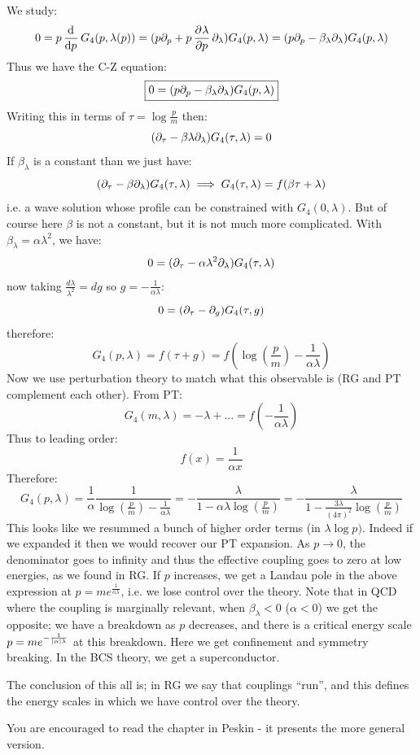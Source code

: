 We study:
\begin{equation}
    0 = p\dod{}{p}G_4(p, \lambda(p)) = (p\p_p + p\dpd{\lambda}{p}\p_\lambda) G_4(p, \lambda) = (p\p_p - \beta_\lambda \p_\lambda) G_4(p, \lambda) 
\end{equation}
Thus we have the C-Z equation:
\begin{equation}
    \boxed{0 = (p\partial_p - \beta_\lambda \partial_\lambda) G_4(p, \lambda)}
\end{equation}
Writing this in terms of $\tau = \log \frac{p}{m}$ then:
\begin{equation}
    (\partial_\tau - \beta\lambda \partial_\lambda)G_4(\tau, \lambda) = 0
\end{equation}
If $\beta_\lambda$ is a constant than we just have:
\begin{equation}
    (\partial_\tau - \beta \partial_\lambda)G_4(\tau, \lambda) \implies G_4(\tau, \lambda) = f(\beta\tau + \lambda)
\end{equation}
i.e. a wave solution whose profile can be constrained with $G_4(0, \lambda)$. But of course here $\beta$ is not a constant, but it is not much more complicated. With $\beta_\lambda = \alpha\lambda^2$, we have:
\begin{equation}
    0 = (\partial_\tau - \alpha\lambda^2\partial_\lambda)G_4(\tau, \lambda)
\end{equation}
now taking $\frac{d\lambda}{\lambda^2} = dg$ so $g = -\frac{1}{\alpha\lambda}$:
\begin{equation}
    0 = (\partial_\tau - \partial_g)G_4(\tau, g)
\end{equation}
therefore:
\begin{equation}
    G_4(p, \lambda) = f(\tau + g) = f(\log(\frac{p}{m}) - \frac{1}{\alpha\lambda})
\end{equation}
Now we use perturbation theory to match what this observable is (RG and PT complement each other). From PT:
\begin{equation}
    G_4(m, \lambda) = -\lambda + \ldots = f(-\frac{1}{\alpha\lambda})
\end{equation}
Thus to leading order:
\begin{equation}
    f(x) = \frac{1}{\alpha x}
\end{equation}
Therefore:
\begin{equation}
    G_4(p, \lambda) = \frac{1}{\alpha}\frac{1}{\log(\frac{p}{m}) - \frac{1}{\alpha\lambda}} = -\frac{\lambda}{1 - \alpha\lambda\log(\frac{p}{m})} = -\frac{\lambda}{1 - \frac{3\lambda}{(4\pi)^2}\log(\frac{p}{m})}
\end{equation}
This looks like we resummed a bunch of higher order terms (in $\lambda \log p)$. Indeed if we expanded it then we would recover our PT expansion. As $p \to 0$, the denominator goes to infinity and thus the effective coupling goes to zero at low energies, as we found in RG. If $p$ increases, we get a Landau pole in the above expression at $p = me^{\frac{1}{\alpha\lambda}}$, i.e. we lose control over the theory. Note that in QCD where the coupling is marginally relevant, when $\beta_\lambda < 0$ ($\alpha < 0$) we get the opposite; we have a breakdown as $p$ decreases, and there is a critical energy scale $p = me^{-\frac{1}{\lvert \alpha \rvert\lambda}}$ at this breakdown. Here we get confinement and symmetry breaking. In the BCS theory, we get a superconductor.

The conclusion of this all is; in RG we say that couplings ``run'', and this defines the energy scales in which we have control over the theory.

You are encouraged to read the chapter in Peskin - it presents the more general version.